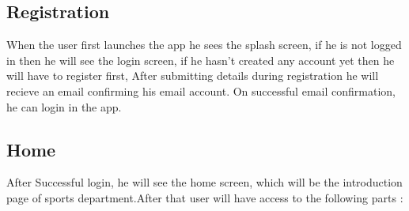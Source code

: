 	\subsection{Registration}
	When the user first launches the app he sees the splash screen, if he is not logged in then he will see the login screen, if he hasn't created any account yet then he will have to register first, After submitting details during registration he will recieve an email confirming his email account. On successful email confirmation, he can login in the app. \\
	
	\subsection{Home}
	After Successful login, he will see the home screen, which will be the introduction page of sports department.After that user will have access to the following parts : 
